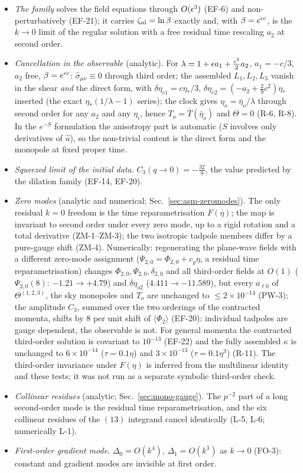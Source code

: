 \begin{itemize}\itemsep2pt
\item \emph{The family} solves the field equations through $O(\epsilon^3)$ (EF-6) and non-perturbatively (EF-21); it carries $\zeta_{\rm nl}=\ln\beta$
exactly and, with $\beta=e^{\epsilon c}$, is the $k\to0$ limit of the regular solution with a free residual time rescaling $a_2$ at second order.
\item \emph{Cancellation in the observable} (analytic).  For $\lambda=1+\epsilon a_1+\tfrac{\epsilon^2}2a_2$, $a_1=-c/3$, $a_2$ free, $\beta=e^{\epsilon c}$:
$\hat\sigma_{\mu\nu}\equiv0$ through third order; the assembled $L_1,L_2,L_3$ vanish in the shear \emph{and} the direct form, with
$\delta\eta_{e1}=c\eta_*/3$, $\delta\eta_{e2}=(-a_2+\tfrac29c^2)\eta_*$ inserted (the exact $\eta_*(1/\lambda-1)$ series); the clock gives
$\eta_o=\bar\eta_o/\lambda$ through second order for any $a_2$ and any $\eta_i$, hence $T_o=\bar T(\bar\eta_o)$ and $\Theta=0$ (R-6, R-8).  In the $e^{-S}$
formulation the anisotropy part is automatic ($S$ involves only derivatives of $\hat u$), so the non-trivial content is the direct form and
the monopole at fixed proper time.
\item \emph{Squeezed limit of the initial data}.  $C_3(q\to0)=-\tfrac{32}9$, the value predicted by the dilation family (EF-14, EF-20).
\item \emph{Zero modes} (analytic and numerical; Sec.~\ref{sec:asm-zeromodes}).  The only residual $k=0$ freedom is the time reparametrisation
$F(\eta)$; the map is invariant to second order under every zero mode, up to a rigid rotation and a total derivative (ZM-1--ZM-3); the two isotropic
tadpole members differ by a pure-gauge shift (ZM-4).  Numerically: regenerating the plane-wave fields with a different zero-mode assignment
($\Psi_{2,0}=\Phi_{2,0}+c_g\eta$, a residual time reparametrisation) changes $\Phi_{2,0},\Psi_{2,0},\delta_{2,0}$ and all third-order fields at
$O(1)$ ($\Psi_{2,0}(8)$: $-1.21\to+4.79$) and $\delta\eta_{o2}$ ($4.411\to-11.589$), but every $a_{\ell0}$ of $\Theta^{(1,2,3)}$, the sky monopoles and $T_o$
are unchanged to $\le2\times10^{-14}$ (PW-3); the amplitude $C_3$, summed over the two orderings of the contracted momenta, shifts by 8 per unit shift
of $\langle\Phi_2\rangle$ (EF-20): individual tadpoles are gauge dependent, the observable is not.  For general momenta the contracted third-order
solution is covariant to $10^{-13}$ (EF-22) and the fully assembled $\kappa$ is unchanged to $6\times10^{-14}$ ($\tau=0.1\eta$) and $3\times10^{-13}$
($\tau=0.1\eta^3$) (R-11).  The third-order invariance under $F(\eta)$ is inferred from the multilinear identity and these tests; it was not run
as a separate symbolic third-order check.
\item \emph{Collinear residues} (analytic; Sec.~\ref{sec:mono-gauge}).  The $p^{-2}$ part of a long second-order mode is the residual time
reparametrisation, and the six collinear residues of the $(13)$ integrand cancel identically (L-5, L-6; numerically L-1).
\item \emph{First-order gradient mode}.  $\Delta_0=O(k^4)$, $\Delta_1=O(k^3)$ as $k\to0$ (FO-3): constant and gradient modes are invisible at first order.
\end{itemize}

